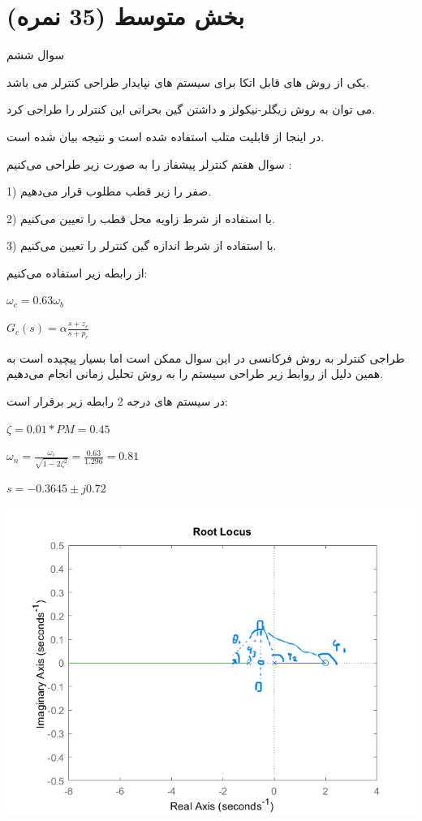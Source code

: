 \documentclass{article}
\begin{document}
\section{بخش متوسط (35 نمره)}

\begin{problem}{سوال ششم}
	\raggedright
	یکی از روش های قابل اتکا برای سیستم های نپایدار طراحی کنترلر  می باشد.
	
	می توان به روش زیگلر-نیکولز و داشتن گین بحرانی این کنترلر را طراحی کرد.
	
	در اینجا از قابلیت  متلب استفاده شده است و نتیجه بیان شده است.

\end{problem}
	

\begin{problem}{سوال هفتم}
	کنترلر پیشفاز را به صورت زیر طراحی می‌کنیم :
	
	1) صفر را زیر قطب مطلوب قرار می‌دهیم.
	
	2) با استفاده از شرط زاویه محل قطب را تعیین می‌کنیم.
	
	3) با استفاده از شرط اندازه گین کنترلر را تعیین می‌کنیم.
	
	از رابطه زیر استفاده می‌کنیم:
	
	\raggedleft
	$\omega_c = 0.63\omega_b$
	
	$G_c(s) = \alpha \frac{s+z_c}{s+p_c}$
	
	\raggedright
	طراجی کنترلر به روش فرکانسی در این سوال ممکن است اما بسیار پیچیده است به همین دلیل از روابط زیر طراحی سیستم را به روش تحلیل زمانی انجام می‌دهیم.
	
	در سیستم های درجه 2 رابطه زیر برقرار است:
	
	\raggedleft
	$\zeta = 0.01*PM = 0.45$
	
	$\omega_n = \frac{\omega_c}{\sqrt{1-2\zeta^2}} = \frac{0.63}{1.296} = 0.81 $
	
	$s = -0.3645 \pm j0.72$
	
	\raggedright
	
	\centering
	\includegraphics[scale=0.6]{Resources/7.png}
	

\end{problem}
\end{document}
